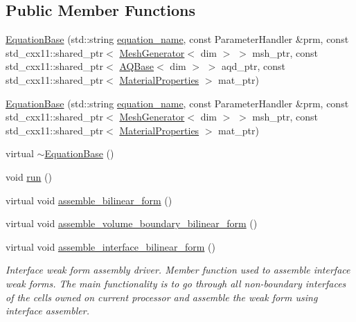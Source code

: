 \subsection*{Public Member Functions}
\begin{DoxyCompactItemize}
\item 
\hyperlink{class_equation_base_a1e027696da2ab5a030daa34bf99430fe}{Equation\+Base} (std\+::string \hyperlink{class_equation_base_a0a72472959e531f5256400dec911f3a5}{equation\+\_\+name}, const Parameter\+Handler \&prm, const std\+\_\+cxx11\+::shared\+\_\+ptr$<$ \hyperlink{class_mesh_generator}{Mesh\+Generator}$<$ dim $>$ $>$ msh\+\_\+ptr, const std\+\_\+cxx11\+::shared\+\_\+ptr$<$ \hyperlink{class_a_q_base}{A\+Q\+Base}$<$ dim $>$ $>$ aqd\+\_\+ptr, const std\+\_\+cxx11\+::shared\+\_\+ptr$<$ \hyperlink{class_material_properties}{Material\+Properties} $>$ mat\+\_\+ptr)
\item 
\hyperlink{class_equation_base_a5e3fdb508c7aa186117ae81883ef1c59}{Equation\+Base} (std\+::string \hyperlink{class_equation_base_a0a72472959e531f5256400dec911f3a5}{equation\+\_\+name}, const Parameter\+Handler \&prm, const std\+\_\+cxx11\+::shared\+\_\+ptr$<$ \hyperlink{class_mesh_generator}{Mesh\+Generator}$<$ dim $>$ $>$ msh\+\_\+ptr, const std\+\_\+cxx11\+::shared\+\_\+ptr$<$ \hyperlink{class_material_properties}{Material\+Properties} $>$ mat\+\_\+ptr)
\item 
virtual \hyperlink{class_equation_base_aee6cf5fc2a1580bb6070babdab0626ab}{$\sim$\+Equation\+Base} ()
\item 
void \hyperlink{class_equation_base_a7692b87c807ce4ed5081dab4dc28decb}{run} ()
\item 
virtual void \hyperlink{class_equation_base_a7d4047f59b31ef73ef404ab396712878}{assemble\+\_\+bilinear\+\_\+form} ()
\item 
virtual void \hyperlink{class_equation_base_a42472101cbaeab32d22c4e8ff1dc9830}{assemble\+\_\+volume\+\_\+boundary\+\_\+bilinear\+\_\+form} ()
\item 
virtual void \hyperlink{class_equation_base_ac590b2065d95ea03fcf411c965e6cfd9}{assemble\+\_\+interface\+\_\+bilinear\+\_\+form} ()
\begin{DoxyCompactList}\small\item\em Interface weak form assembly driver. Member function used to assemble interface weak forms. The main functionality is to go through all non-\/boundary interfaces of the cells owned on current processor and assemble the weak form using interface assembler. \end{DoxyCompactList}\item 

\end{DoxyCompactItemize}
